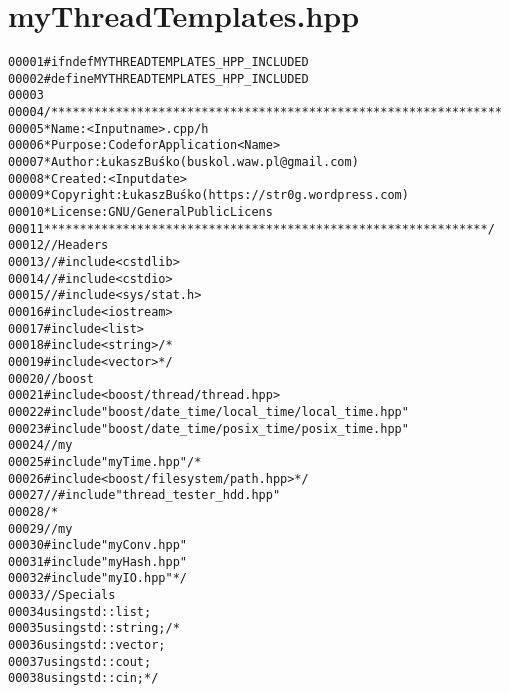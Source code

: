 \hypertarget{myThreadTemplates_8hpp_source}{
\section{myThreadTemplates.hpp}
}


\begin{footnotesize}\begin{alltt}
00001 \textcolor{preprocessor}{#ifndef MYTHREADTEMPLATES\_HPP\_INCLUDED}
00002 \textcolor{preprocessor}{}\textcolor{preprocessor}{#define MYTHREADTEMPLATES\_HPP\_INCLUDED}
00003 \textcolor{preprocessor}{}
00004 \textcolor{comment}{/***************************************************************}
00005 \textcolor{comment}{ * Name:      <Input name>.cpp/h}
00006 \textcolor{comment}{ * Purpose:   Code for Application <Name>}
00007 \textcolor{comment}{ * Author:    Łukasz Buśko (buskol.waw.pl@gmail.com)}
00008 \textcolor{comment}{ * Created:   <Input date>}
00009 \textcolor{comment}{ * Copyright: Łukasz Buśko (https://str0g.wordpress.com)}
00010 \textcolor{comment}{ * License:   GNU / General Public Licens}
00011 \textcolor{comment}{ **************************************************************/}
00012 \textcolor{comment}{//Headers}
00013 \textcolor{comment}{//#include <cstdlib>}
00014 \textcolor{comment}{//#include <cstdio>}
00015 \textcolor{comment}{//#include <sys/stat.h>}
00016 \textcolor{preprocessor}{#include <iostream>}
00017 \textcolor{preprocessor}{#include <list>}
00018 \textcolor{preprocessor}{#include <string>}\textcolor{comment}{/*}
00019 \textcolor{comment}{#include <vector>*/}
00020 \textcolor{comment}{//boost}
00021 \textcolor{preprocessor}{#include <boost/thread/thread.hpp>}
00022 \textcolor{preprocessor}{#include "boost/date\_time/local\_time/local\_time.hpp"}
00023 \textcolor{preprocessor}{#include "boost/date\_time/posix\_time/posix\_time.hpp"}
00024 \textcolor{comment}{//my}
00025 \textcolor{preprocessor}{#include "myTime.hpp"}\textcolor{comment}{/*}
00026 \textcolor{comment}{#include <boost/filesystem/path.hpp>*/}
00027 \textcolor{comment}{//#include "thread\_tester\_hdd.hpp"}
00028 \textcolor{comment}{/*}
00029 \textcolor{comment}{//my}
00030 \textcolor{comment}{#include "myConv.hpp"}
00031 \textcolor{comment}{#include "myHash.hpp"}
00032 \textcolor{comment}{#include "myIO.hpp"*/}
00033 \textcolor{comment}{//Specials}
00034 \textcolor{keyword}{using} std::list;
00035 \textcolor{keyword}{using} std::string;\textcolor{comment}{/*}
00036 \textcolor{comment}{using std::vector;}
00037 \textcolor{comment}{using std::cout;}
00038 \textcolor{comment}{using std::cin;*/}

\end{alltt}
\end{footnotesize}
